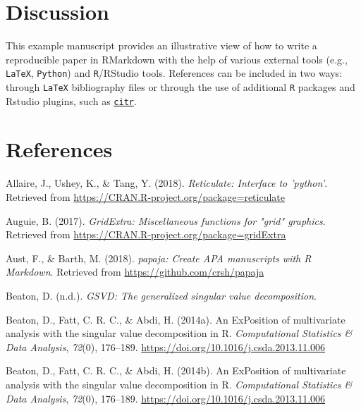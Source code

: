 \documentclass[man,floatsintext]{apa6}
\theoremstyle{definition}
\theoremstyle{definition}
\theoremstyle{definition}
\theoremstyle{remark}
\begin{document}
\hypertarget{discussion}{%
\section{Discussion}\label{discussion}}

This example manuscript provides an illustrative view of how to write a
reproducible paper in RMarkdown with the help of various external tools
(e.g., \texttt{LaTeX}, \texttt{Python}) and \texttt{R}/RStudio tools.
References can be included in two ways: through \texttt{LaTeX}
bibliography files or through the use of additional \texttt{R} packages
and Rstudio plugins, such as
\href{https://github.com/crsh/citr}{\texttt{citr}}.

\newpage

\hypertarget{references}{%
\section{References}\label{references}}

\begingroup
\setlength{\parindent}{-0.5in}
\setlength{\leftskip}{0.5in}

\hypertarget{refs}{}
\leavevmode\hypertarget{ref-R-reticulate}{}%
Allaire, J., Ushey, K., \& Tang, Y. (2018). \emph{Reticulate: Interface
to 'python'}. Retrieved from
\url{https://CRAN.R-project.org/package=reticulate}

\leavevmode\hypertarget{ref-R-gridExtra}{}%
Auguie, B. (2017). \emph{GridExtra: Miscellaneous functions for "grid"
graphics}. Retrieved from
\url{https://CRAN.R-project.org/package=gridExtra}

\leavevmode\hypertarget{ref-R-papaja}{}%
Aust, F., \& Barth, M. (2018). \emph{papaja: Create APA manuscripts with
R Markdown}. Retrieved from \url{https://github.com/crsh/papaja}

\leavevmode\hypertarget{ref-R-GSVD}{}%
Beaton, D. (n.d.). \emph{GSVD: The generalized singular value
decomposition}.

\leavevmode\hypertarget{ref-R-ExPosition}{}%
Beaton, D., Fatt, C. R. C., \& Abdi, H. (2014a). An ExPosition of
multivariate analysis with the singular value decomposition in R.
\emph{Computational Statistics \& Data Analysis}, \emph{72}(0),
176--189. \url{https://doi.org/10.1016/j.csda.2013.11.006}

\leavevmode\hypertarget{ref-R-prettyGraphs}{}%
Beaton, D., Fatt, C. R. C., \& Abdi, H. (2014b). An ExPosition of
multivariate analysis with the singular value decomposition in R.
\emph{Computational Statistics \& Data Analysis}, \emph{72}(0),
176--189. \url{https://doi.org/10.1016/j.csda.2013.11.006}
\end{document}
